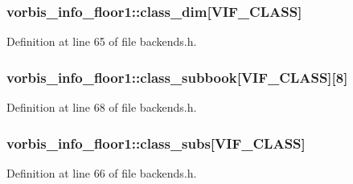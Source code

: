 \subsubsection[{\texorpdfstring{class\+\_\+dim}{class_dim}}]{ vorbis\+\_\+info\+\_\+floor1\+::class\+\_\+dim\mbox{[}{\bf V\+I\+F\+\_\+\+C\+L\+A\+SS}\mbox{]}}\hypertarget{structvorbis__info__floor1_aafa4ec3e13ed54e77effbd1c2f550e00}{}\label{structvorbis__info__floor1_aafa4ec3e13ed54e77effbd1c2f550e00}


Definition at line 65 of file backends.\+h.

\subsubsection[{\texorpdfstring{class\+\_\+subbook}{class_subbook}}]{ vorbis\+\_\+info\+\_\+floor1\+::class\+\_\+subbook\mbox{[}{\bf V\+I\+F\+\_\+\+C\+L\+A\+SS}\mbox{]}\mbox{[}8\mbox{]}}\hypertarget{structvorbis__info__floor1_a87236d836164ba5c67ba79ec90e67fae}{}\label{structvorbis__info__floor1_a87236d836164ba5c67ba79ec90e67fae}


Definition at line 68 of file backends.\+h.

\subsubsection[{\texorpdfstring{class\+\_\+subs}{class_subs}}]{ vorbis\+\_\+info\+\_\+floor1\+::class\+\_\+subs\mbox{[}{\bf V\+I\+F\+\_\+\+C\+L\+A\+SS}\mbox{]}}\hypertarget{structvorbis__info__floor1_a22f4b03eb391dcdceebbe2675195f38a}{}\label{structvorbis__info__floor1_a22f4b03eb391dcdceebbe2675195f38a}


Definition at line 66 of file backends.\+h.

